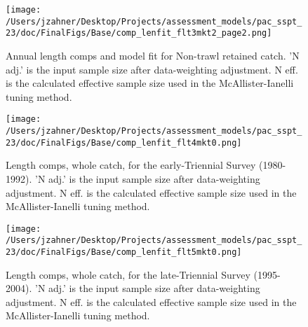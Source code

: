 \documentclass[11pt,
  letterpaper,
]{article}
\begin{document}
\begin{figure}
{\centering
\texttt{[image: /Users/jzahner/Desktop/Projects/assessment\_models/pac\_sspt\_23/doc/FinalFigs/Base/comp\_lenfit\_flt3mkt2\_page2.png]}
}
\caption{Annual length comps and model fit for Non-trawl retained catch. 'N adj.' is the input sample size after data-weighting adjustment. N eff. is the calculated effective sample size used in the McAllister-Ianelli tuning method.\label{fig:nontrawl_comps_2}}
\end{figure}

\begin{figure}
{\centering
\texttt{[image: /Users/jzahner/Desktop/Projects/assessment\_models/pac\_sspt\_23/doc/FinalFigs/Base/comp\_lenfit\_flt4mkt0.png]}
}
\caption{Length comps, whole catch, for the early-Triennial Survey (1980-1992). 'N adj.' is the input sample size after data-weighting adjustment. N eff. is the calculated effective sample size used in the McAllister-Ianelli tuning method.\label{fig:fits_etri}}
\end{figure}

\begin{figure}
{\centering
\texttt{[image: /Users/jzahner/Desktop/Projects/assessment\_models/pac\_sspt\_23/doc/FinalFigs/Base/comp\_lenfit\_flt5mkt0.png]}
}
\caption{Length comps, whole catch, for the late-Triennial Survey (1995-2004). 'N adj.' is the input sample size after data-weighting adjustment. N eff. is the calculated effective sample size used in the McAllister-Ianelli tuning method.\label{fig:fits_ltri}}
\end{figure}
\end{document}
